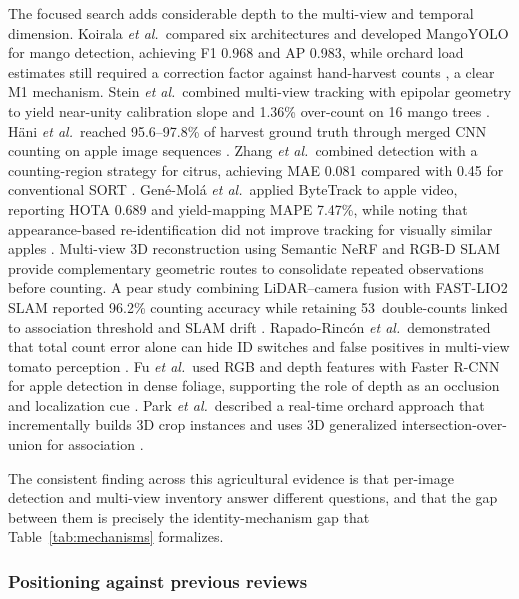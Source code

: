 The focused search adds considerable depth to the multi-view and temporal dimension. Koirala \textit{et al.}\ compared six architectures and developed MangoYOLO for mango detection, achieving F1 0.968 and AP 0.983, while orchard load estimates still required a correction factor against hand-harvest counts \cite{koirala2019deepfruit}, a clear M1 mechanism. Stein \textit{et al.}\ combined multi-view tracking with epipolar geometry to yield near-unity calibration slope and 1.36\% over-count on 16 mango trees \cite{ledger_r_408d13511cac4177}. H\"ani \textit{et al.}\ reached 95.6--97.8\% of harvest ground truth through merged CNN counting on apple image sequences \cite{ledger_r_1358c0868a62c84a}. Zhang \textit{et al.}\ combined detection with a counting-region strategy for citrus, achieving MAE 0.081 compared with 0.45 for conventional SORT \cite{ledger_r_ee550a3e3a6fb318}. Gené-Molá \textit{et al.}\ applied ByteTrack to apple video, reporting HOTA 0.689 and yield-mapping MAPE 7.47\%, while noting that appearance-based re-identification did not improve tracking for visually similar apples \cite{ledger_r_2d972b94554c6cd1}. Multi-view 3D reconstruction using Semantic NeRF \cite{ledger_m_1210e3ea00486b68} and RGB-D SLAM \cite{ledger_r_b2e0e9aabad17a97} provide complementary geometric routes to consolidate repeated observations before counting. A pear study combining LiDAR--camera fusion with FAST-LIO2 SLAM reported 96.2\% counting accuracy while retaining 53~double-counts linked to association threshold and SLAM drift \cite{ledger_r_d4270ea8ab11f268}. Rapado-Rincón \textit{et al.}\ demonstrated that total count error alone can hide ID switches and false positives in multi-view tomato perception \cite{ledger_r_700d34dae0f20d78}. Fu \textit{et al.}\ used RGB and depth features with Faster R-CNN for apple detection in dense foliage, supporting the role of depth as an occlusion and localization cue \cite{fu2020apple}. Park \textit{et al.}\ described a real-time orchard approach that incrementally builds 3D crop instances and uses 3D generalized intersection-over-union for association \cite{park2026cropassociation}.

The consistent finding across this agricultural evidence is that per-image detection and multi-view inventory answer different questions, and that the gap between them is precisely the identity-mechanism gap that Table~\ref{tab:mechanisms} formalizes.

\subsubsection{Positioning against previous reviews}

